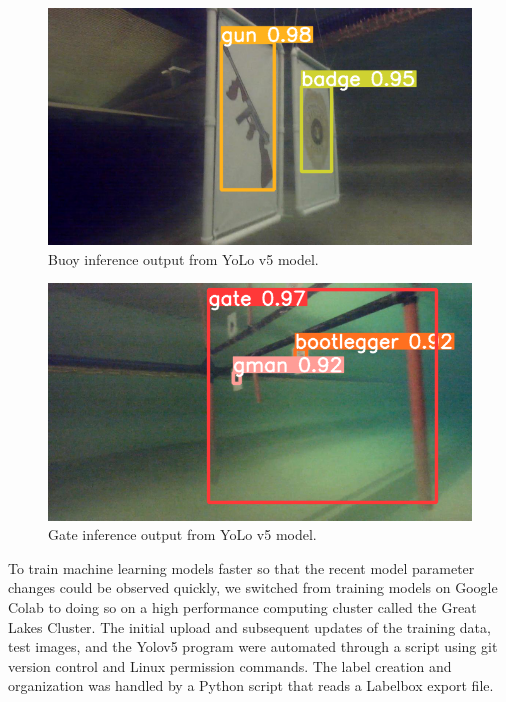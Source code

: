 \documentclass[conference]{IEEEtran}
\begin{document}
    \begin{figure}[htbp]
    \centerline{\includegraphics[scale=0.3]{images/11222021_672_376_181.png}}
    \caption{Buoy inference output from YoLo v5 model.}
    \label{fig:buoys}
    \end{figure}
    \begin{figure}[htbp]
    \centerline{\includegraphics[scale=0.3]{images/11222021_672_376_477.png}}
    \caption{Gate inference output from YoLo v5 model.}
    \label{fig:gate}
    \end{figure}
    
    To train machine learning models faster so that the recent model parameter changes could be observed  quickly, we switched from training models on Google Colab to doing so on a high performance computing cluster called the Great Lakes Cluster. The initial upload and subsequent updates of the training data, test images, and the Yolov5 program were automated through a script using git version control and Linux permission commands. The label creation and organization was handled by a Python script that reads a Labelbox export file.
\end{document}
